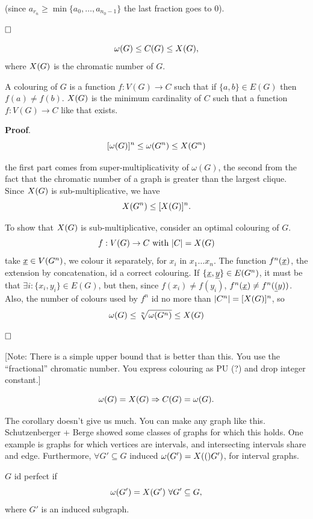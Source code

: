 (since $a_{r_n} \geq \min\{a_0, \ldots,a_{n_0 -1}\}$ the last fraction goes to 0).

$\hfill\Box$

\begin{prop}
 $$\omega(G) \leq C(G) \leq X(G),$$ where $X(G)$ is the chromatic number of $G$.
\end{prop}

A colouring of $G$ is a function $f: V(G) \rightarrow C$ such that if $\{a, b\} \in E(G)$ then $f(a) \not= f(b)$. $X(G)$ is the minimum cardinality of $C$ such that a function $f: V(G) \rightarrow C$ like that exists.

\noindent\textbf{Proof}. 
\[
 [\omega(G)]^n \leq \omega(G^n) \leq X(G^n)
\]

the first part comes from super-multiplicativity of $\omega(G)$, the second from the fact that the chromatic number of a graph is greater than the largest clique. Since $X(G)$ is sub-multiplicative, we have $$X(G^n) \leq [X(G)]^n.$$

To show that $X(G)$ is sub-multiplicative, consider an optimal colouring of $G$. $$f:V(G) \rightarrow C\ \text{with}\ |C| = X(G)$$ take $\underline{x} \in V(G^n)$, we colour it separately, for $x_i$ in $x_1\ldots x_n$. The function $f^n(\underline{x})$, the extension by concatenation, id a correct colouring. If $\{\underline{x}, \underline{y}\} \in E(G^n)$, it must be that $\exists i : \{x_i, y_i\} \in E(G)$, but then, since $f(x_i) \not=f(y_i)$, $f^n(\underline{x}) \not= f^n(\underline{(}y))$. Also, the number of colours used by $f^n$ id no more than $|C^n| = [X(G)]^n$, so
\[
 \omega(G) \leq \sqrt[n]{\omega(G^n)} \leq X(G)
\]

$\hfill\Box$

[Note: There is a simple upper bound that is better than this. You use the ``fractional'' chromatic number. You express colouring as PU (?) and drop integer constant.]

\begin{cor}
 $$\omega(G) = X(G) \Rightarrow C(G) = \omega(G).$$
\end{cor}

The corollary doesn't give us much. You can make any graph like this. Schutzenberger + Berge showed some classes of graphs for which this holds. One example is graphs for which vertices are intervals, and intersecting intervals share and edge. Furthermore, $\forall G' \subseteq G$ induced $\omega(G') = X(()G')$, for interval graphs.

\begin{definition}
 $G$ id perfect if $$\omega(G') = \chrom{G'}\ \forall G' \subseteq G,$$ where $G'$ is an induced subgraph.
\end{definition}

